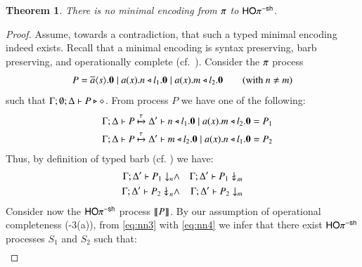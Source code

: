 \documentclass[preprint,11pt]{elsarticle}
\newtheorem{theorem}{Theorem}[section]
\begin{document}
{%

\begin{theorem}%
	\label{t:negative}
	There is no minimal encoding from
		$\pi$ to $\mathsf{HO}\pi^{\mathsf{-sh}}$.
\end{theorem}


\begin{proof}
	Assume, towards a contradiction, that such a typed minimal encoding indeed exists. 
	Recall that a minimal encoding is syntax preserving,
	barb preserving, 
	and operationally complete (cf.~).
	Consider the $\pi$ process
	\[
		P = \overline{a} \langle s \rangle . \mathbf{0} \;|\; a (x) . n \triangleleft l_1 . \mathbf{0} \;|\; a (x) . m \triangleleft l_2 . \mathbf{0} \qquad \text{(with $n \neq m$)}
	\]
	\noi such that 
	$\Gamma; \emptyset; \Delta \vdash P \triangleright \diamond$.
	From process $P$ we have one of the following: %
	\begin{eqnarray}
		& & \Gamma; \Delta \vdash P \xmapsto{\tau} \Delta' \vdash n \triangleleft l_1 . \mathbf{0} \;|\; a (x) . m \triangleleft l_2 . \mathbf{0} = P_1 \label{eq:nn3} \\
		& & \Gamma; \Delta \vdash P \xmapsto{\tau} \Delta' \vdash m \triangleleft l_2 . \mathbf{0} \;|\; a (x) . n \triangleleft l_1 . \mathbf{0} = P_2 \label{eq:nn4}
	\end{eqnarray}
	Thus, by definition of typed barb (cf. ) we  have:
	\begin{eqnarray}
		\Gamma; \Delta' \vdash P_1 \downarrow_{n} & \land & 
		\Gamma; \Delta' \vdash P_1 \not\downarrow_{m} \label{eq:nn1} \\
		\Gamma; \Delta' \vdash P_2 \not\downarrow_{n}  & \land & 
		 \Gamma; \Delta' \vdash P_2 \downarrow_{m}
		\label{eq:nn2}
	\end{eqnarray}
	Consider now the $\mathsf{HO}\pi^{\mathsf{-sh}}$ process $\llbracket P\rrbracket$.
	By our assumption of operational completeness 
	(-3(a)), 
	from \eqref{eq:nn3} with \eqref{eq:nn4}
	we infer that
	there exist $\mathsf{HO}\pi^{\mathsf{-sh}}$ processes $S_1$ and $S_2$ such that:
	\begin{eqnarray}

\end{eqnarray}
\end{proof}}
\end{document}
